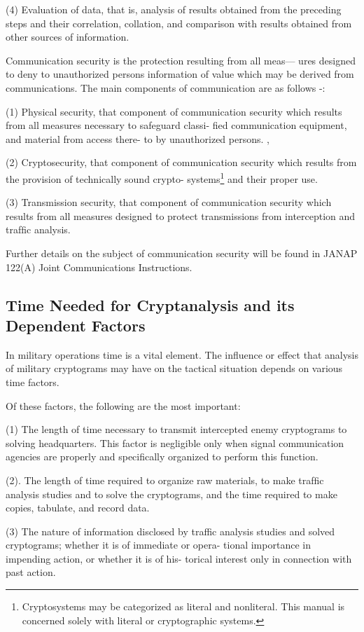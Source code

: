 (4) Evaluation of data, that is, analysis of results obtained from the
preceding steps and their correlation, collation, and comparison
with results obtained from other sources of information.

\mypara Communication security is the protection resulting from all meas—
ures designed to deny to unauthorized persons information of value
which may be derived from communications. The main components of
communication are as follows -:

(1) Physical security, that component of communication security
which results from all measures necessary to safeguard classi-
ﬁed communication equipment, and material from access there-
to by unauthorized persons. ,

(2) Cryptosecurity, that component of communication security
which results from the provision of technically sound crypto-
systems\footnote{ Cryptosystems may be categorized as literal and nonliteral. This manual is concerned solely with literal or cryptographic systems.  } and their proper use.

(3) Transmission security, that component of communication
security which results from all measures designed to protect
transmissions from interception and trafﬁc analysis.

\mypara Further details on the subject of communication security will be
found in JANAP 122(A) Joint Communications Instructions.

\subsection{Time Needed for Cryptanalysis and its Dependent Factors}

\mypara In military operations time is a vital element. The inﬂuence or effect
that analysis of military cryptograms may have on the tactical situation
depends on various time factors.

\mypara Of these factors, the following are the most important:

(1) The length of time necessary to transmit intercepted enemy
cryptograms to solving headquarters. This factor is negligible
only when signal communication agencies are properly and
speciﬁcally organized to perform this function.

(2). The length of time required to organize raw materials, to make
trafﬁc analysis studies and to solve the cryptograms, and the
time required to make copies, tabulate, and record data.

(3) The nature of information disclosed by traffic analysis studies
and solved cryptograms; whether it is of immediate or opera-
tional importance in impending action, or whether it is of his-
torical interest only in connection with past action.

